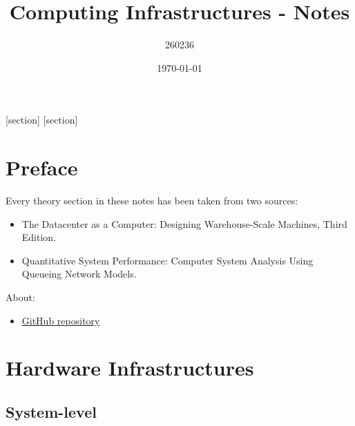 \documentclass[a4paper]{article}
\begin{document}
    [section]
    [section]
    
    

    \author{260236}
	\title{Computing Infrastructures - Notes}
	\date{\printdayoff\today}
	\maketitle

	\newpage

    \section*{Preface}

    Every theory section in these notes has been taken from two sources:
    \begin{itemize}
        \item The Datacenter as a Computer: Designing Warehouse-Scale Machines, Third Edition.\cite{barroso2022datacenter}

        \item Quantitative System Performance: Computer System Analysis Using Queueing Network Models.\cite{lazowska1984quantitative}
    \end{itemize}
    About:
    \begin{itemize}
        \item[\faIcon{github}] \href{https://github.com/PoliMI-HPC-E-notes-projects-AndreVale69/HPC-E-PoliMI-university-notes}{GitHub repository}
    \end{itemize}
    
    \newpage
	
	\tableofcontents

    \newpage

    \section{Hardware Infrastructures}

    \subsection{System-level}
\end{document}
